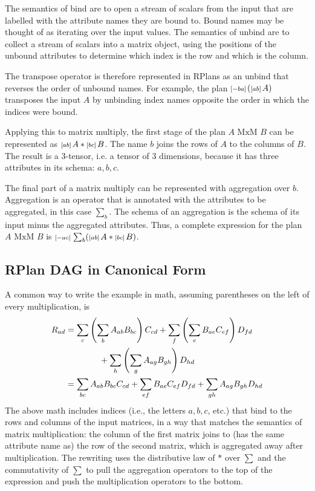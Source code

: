 The semantics of bind are to open a stream of scalars from the input that are labelled with the attribute names they are bound to.  Bound names may be thought of as iterating over the input values.
The semantics of unbind are to collect a stream of scalars into a matrix object, using the positions of the unbound attributes to determine which index is the row and which is the column.

The transpose operator is therefore represented in RPlans as an unbind that reverses the order of unbound names.
For example, the plan ${\scriptstyle\left[-ba\right]\,}( {\scriptstyle\left[ab\right]\,}A )$ transposes the input $A$ by unbinding index names opposite the order in which the indices were bound.

Applying this to matrix multiply, the first stage of the plan $A \text{ MxM } B$ can be represented as ${\scriptstyle\left[ab\right]\,} A * {\scriptstyle\left[bc\right]\,} B$.
The name $b$ joins the rows of $A$ to the columns of $B$.  
The result is a 3-tensor, i.e. a tensor of 3 dimensions, because it has three attributes in its schema: $a, b, c$.

The final part of a matrix multiply can be represented with aggregation over $b$.
Aggregation is an operator that is annotated with the attributes to be aggregated, in this case $\sum_b$.
The schema of an aggregation is the schema of its input minus the aggregated attributes.
Thus, a complete expression for the plan $A \text{ MxM } B$ is ${\scriptstyle\left[-ac\right]\,} \sum_b( {\scriptstyle\left[ab\right]\,} A * {\scriptstyle\left[bc\right]\,} B )$.








\subsection{RPlan DAG in Canonical Form}
A common way to write the example in math, assuming parentheses on the left of every multiplication, is
\begin{align*}
R_{ad} &= 
\sum_c \left(\sum_b A_{ab} B_{bc}\right) C_{cd} + 
\sum_f \left(\sum_e B_{ae} C_{ef}\right) D_{fd} \\&\qquad\qquad +
\sum_h \left(\sum_g A_{ag} B_{gh}\right) D_{hd} \\
&= \sum_{bc} A_{ab} B_{bc} C_{cd} + \sum_{ef} B_{ae} C_{ef} D_{fd} + \sum_{gh} A_{ag} B_{gh} D_{hd}
\end{align*}
The above math includes indices (i.e., the letters $a, b, c$, etc.) that bind to the rows and columns of the input matrices, in a way that matches the semantics of matrix multiplication:
the column of the first matrix joins to (has the same attribute name as) the row of the second matrix, which is aggregated away after multiplication.
The rewriting uses the distributive law of $*$ over $\sum$ and the commutativity of $\sum$ to pull the aggregation operators to the top of the expression and push the multiplication operators to the bottom.  

